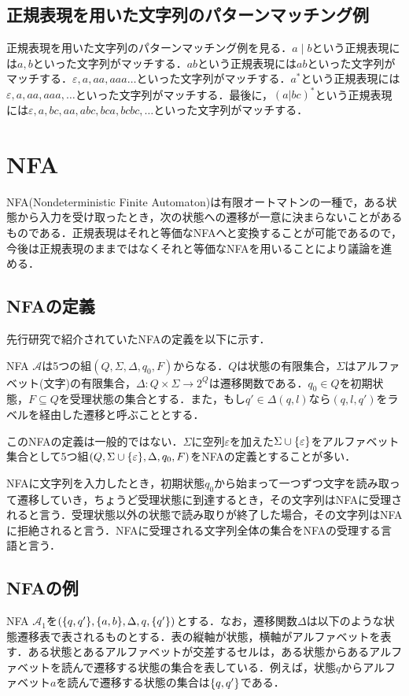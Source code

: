 \documentclass[a4paper, 12pt, dvipdfmx, uplatex]{jsreport}
\begin{document}
\subsection{正規表現を用いた文字列のパターンマッチング例}
正規表現を用いた文字列のパターンマッチング例を見る．$a\mid b$という正規表現には$a,b$といった文字列がマッチする．$ab$という正規表現には$ab$といった文字列がマッチする．$\varepsilon,a,aa,aaa\ldots$といった文字列がマッチする．$a^*$という正規表現には$\varepsilon,a,aa,aaa,\ldots$といった文字列がマッチする．最後に，$(a|bc)^*$という正規表現には$\varepsilon,a,bc,aa,abc,bca,bcbc,\ldots$といった文字列がマッチする．


\section{NFA}
NFA(Nondeterministic Finite Automaton)は有限オートマトンの一種で，ある状態から入力を受け取ったとき，次の状態への遷移が一意に決まらないことがあるものである．正規表現はそれと等価なNFAへと変換することが可能であるので，今後は正規表現のままではなくそれと等価なNFAを用いることにより議論を進める．

\subsection{NFAの定義}
先行研究で紹介されていたNFAの定義を以下に示す．
\begin{dfn}[NFA]
  NFA $\mathcal{A}$は5つの組$(Q,\Sigma,\Delta,q_0,F)$からなる．$Q$は状態の有限集合，$\Sigma$はアルファベット(文字)の有限集合，$\Delta :Q\times \Sigma \rightarrow 2^Q$は遷移関数である．$q_0 \in Q$を初期状態，$F \subseteq Q$を受理状態の集合とする．また，もし$q'\in \Delta (q,l)$なら$(q,l,q')$をラベルを経由した遷移と呼ぶこととする．
\end{dfn}

このNFAの定義は一般的ではない．$\Sigma$に空列$\varepsilon$を加えた$\Sigma \cup \qty{\varepsilon}$をアルファベット集合として5つ組$(Q,\Sigma \cup \qty{\varepsilon},\Delta,q_0,F)$をNFAの定義とすることが多い．

NFAに文字列を入力したとき，初期状態$q_0$から始まって一つずつ文字を読み取って遷移していき，ちょうど受理状態に到達するとき，その文字列はNFAに受理されると言う．受理状態以外の状態で読み取りが終了した場合，その文字列はNFAに拒絶されると言う．NFAに受理される文字列全体の集合をNFAの受理する言語と言う．



\subsection{NFAの例}
NFA $\mathcal{A}_1$を$(\qty{q,q'},\qty{a,b},\Delta,q,\qty{q'})$とする．なお，遷移関数$\Delta$は以下のような状態遷移表で表されるものとする．表の縦軸が状態，横軸がアルファベットを表す．ある状態とあるアルファベットが交差するセルは，ある状態からあるアルファベットを読んで遷移する状態の集合を表している．例えば，状態$q$からアルファベット$a$を読んで遷移する状態の集合は$\qty{q,q'}$である．
\end{document}

